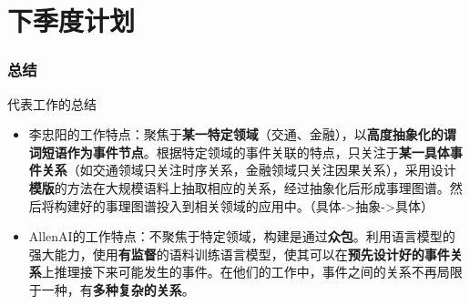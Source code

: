 \documentclass[10pt,aspectratio=43,mathserif]{beamer}
\begin{document}
\section[计划]{下季度计划}


		
        \begin{frame}
            \frametitle{\textbf{总结}}
            \begin{block}{代表工作的总结}
                \begin{itemize}
                    \item 李忠阳的工作特点：聚焦于\textbf{某一特定领域}（交通、金融），以\textbf{高度抽象化的谓词短语作为事件节点}。根据特定领域的事件关联的特点，只关注于\textbf{某一具体事件关系}（如交通领域只关注时序关系，金融领域只关注因果关系），采用设计\textbf{模版}的方法在大规模语料上抽取相应的关系，经过抽象化后形成事理图谱。然后将构建好的事理图谱投入到相关领域的应用中。（具体->抽象->具体）
                    \item AllenAI的工作特点：不聚焦于特定领域，构建是通过\textbf{众包}。利用语言模型的强大能力，使用\textbf{有监督}的语料训练语言模型，使其可以在\textbf{预先设计好的事件关系}上推理接下来可能发生的事件。在他们的工作中，事件之间的关系不再局限于一种，有\textbf{多种复杂的关系}。
                \end{itemize}

            \end{block}
        \end{frame}
        
\end{document}

